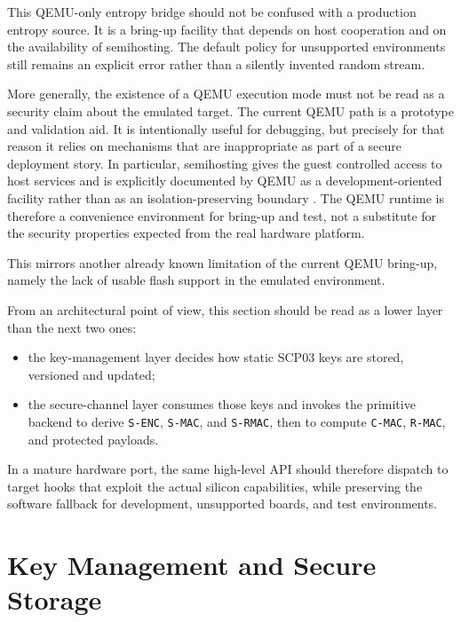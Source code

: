 This QEMU-only entropy bridge should not be confused with a production entropy
source. It is a bring-up facility that depends on host cooperation and on the
availability of semihosting. The default policy for unsupported environments
still remains an explicit error rather than a silently invented random stream.

More generally, the existence of a QEMU execution mode must not be read as a
security claim about the emulated target. The current QEMU path is a prototype
and validation aid. It is intentionally useful for debugging, but precisely for
that reason it relies on mechanisms that are inappropriate as part of a secure
deployment story. In particular, semihosting gives the guest controlled access
to host services and is explicitly documented by QEMU as a development-oriented
facility rather than as an isolation-preserving boundary
\cite{qemu-security,qemu-semihosting}. The QEMU runtime is therefore a
convenience environment for bring-up and test, not a substitute for the
security properties expected from the real hardware platform.

This mirrors another already known limitation of the current QEMU bring-up,
namely the lack of usable flash support in the emulated environment.

From an architectural point of view, this section should be read as a lower
layer than the next two ones:
\begin{itemize}
\item the key-management layer decides how static SCP03 keys are stored,
  versioned and updated;
\item the secure-channel layer consumes those keys and invokes the primitive
  backend to derive \texttt{S-ENC}, \texttt{S-MAC}, and \texttt{S-RMAC}, then
  to compute \texttt{C-MAC}, \texttt{R-MAC}, and protected payloads.
\end{itemize}

In a mature hardware port, the same high-level API should therefore dispatch to
target hooks that exploit the actual silicon capabilities, while preserving the
software fallback for development, unsupported boards, and test environments.

\section{Key Management and Secure Storage}
\label{sec:impl-key-management}

